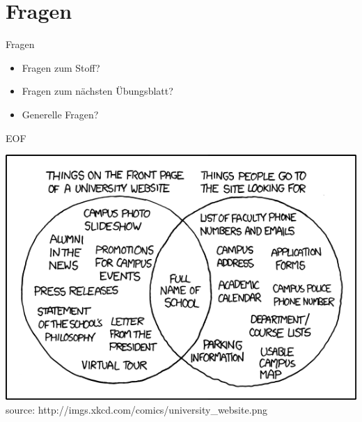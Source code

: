 \documentclass[18pt]{beamer}
\begin{document}
	\section{Fragen}
	\begin{frame} {Fragen}
		\begin{itemize}
			\item Fragen zum Stoff?
			\item Fragen zum n\"achsten \"Ubungsblatt?
			\item Generelle Fragen?
		\end{itemize}
	\end{frame}

	
	\begin{frame} {EOF}
		\begin{center}
			\includegraphics[scale=0.5]{graphics/02/eof2.png}\\
			\tiny source: http://imgs.xkcd.com/comics/university_website.png
		\end{center}
	\end{frame}
\end{document}
